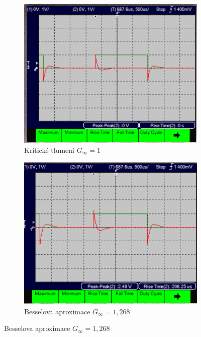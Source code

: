 \documentclass[twoside]{article}
\begin{document}
\begin{figure}[h!]
    \centering
    \begin{subfigure}{0.48\textwidth}
        \centering
        \includegraphics[width=1\linewidth]{step_kriticke.png}
        \caption{Kritické tlumení $G_{\infty} = 1$}
        \label{fig:step_kriticke}
    \end{subfigure}
    \begin{subfigure}{0.48\textwidth}
        \centering
        \includegraphics[width=1\linewidth]{step_bessel.png}
        \caption{Besselova aproximace $G_{\infty} = 1,268$}
        \label{fig:step_bessel}
    \end{subfigure}


\end{figure}
\end{document}
